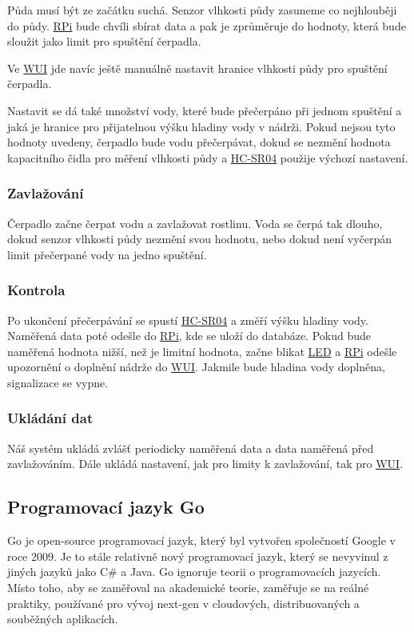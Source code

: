 \documentclass[czech,12pt,a4paper]{article}
\begin{document}
Půda musí být ze začátku suchá. Senzor vlhkosti půdy zasuneme co nejhlouběji do půdy. \underline{\ac{RPi}} bude chvíli sbírat data a pak je zprůměruje do hodnoty, která bude sloužit jako limit pro spuštění čerpadla.

Ve \underline{\ac{WUI}} jde navíc ještě manuálně nastavit hranice vlhkosti půdy pro spuštění čerpadla.

Nastavit se dá také množství vody, které bude přečerpáno při jednom spuštění a jaká je hranice pro přijatelnou výšku hladiny vody v nádrži. Pokud nejsou tyto hodnoty uvedeny, čerpadlo bude vodu přečerpávat, dokud se nezmění hodnota kapacitního čidla pro měření vlhkosti půdy a \space \underline{\ac{HC-SR04}} použije výchozí nastavení.

\subsubsection{Zavlažování}

Čerpadlo začne čerpat vodu a zavlažovat rostlinu. Voda se čerpá tak dlouho, dokud senzor vlhkosti půdy nezmění svou hodnotu, nebo dokud není vyčerpán limit přečerpané vody na jedno spuštění.

\subsubsection{Kontrola}

Po ukončení přečerpávání se spustí \underline{\ac{HC-SR04}} a změří výšku hladiny vody. Naměřená data poté odešle do \underline{\ac{RPi}}, kde se uloží do databáze. Pokud bude naměřená hodnota nižší, než je limitní hodnota, začne blikat \underline{\ac{LED}} a \underline{\ac{RPi}} odešle upozornění o doplnění nádrže do \underline{\ac{WUI}}. Jakmile bude hladina vody doplněna, signalizace se vypne.

\subsubsection{Ukládání dat}

Náš systém ukládá zvlášť periodicky naměřená data a data naměřená před zavlažováním. Dále ukládá nastavení, jak pro limity k zavlažování, tak pro \underline{\ac{WUI}}.

\subsection{Programovací jazyk Go}

Go je open-source programovací jazyk, který byl vytvořen společností Google v roce 2009. Je to stále relativně nový programovací jazyk, který se nevyvinul z jiných jazyků jako C\# a Java. Go ignoruje teorii o programovacích jazycích. Místo toho, aby se zaměřoval na akademické teorie, zaměřuje se na reálné praktiky, používané pro vývoj next-gen v cloudových, distribuovaných a souběžných aplikacích.
\end{document}
